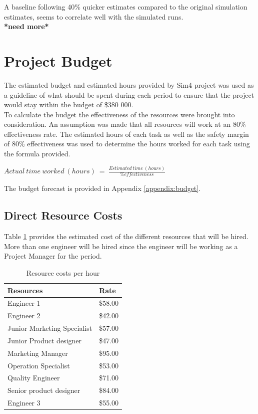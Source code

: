 A baseline following 40\% quicker estimates compared to the original simulation estimates, seems to correlate well with the simulated runs.\\

\textbf{*need more*}

\newpage
\section{Project Budget}

The estimated budget and estimated hours provided by Sim4 project was used as a guideline of what should be spent during each period to ensure that the project would stay within the budget of \$380 000.\\

\noindent
To calculate the budget the effectiveness of the resources were brought into consideration. An assumption was made that all resources will work at an 80\% effectiveness rate. The estimated hours of each task as well as the safety margin of 80\% effectiveness was used to determine the hours worked for each task using the formula provided.\\

\begin{center}
$ Actual\ time\ worked\ (hours)\ =\ \frac{Estimated\ time\ (hours)}{\% effectiveness} $
\end{center}

The budget forecast is provided in Appendix \ref{appendix:budget}.

\subsection{Direct Resource Costs}

Table \ref{tab:resourcecosts} provides the estimated cost of the different resources that will be hired. More than one engineer will be hired since the engineer will be working as a Project Manager for the period.

\begin{table}[]
\centering
\caption{Resource costs per hour}
\label{tab:resourcecosts}
\begin{tabular}{ll}
\textbf{Resources}          & \textbf{Rate} \\\hline
Engineer 1                  & \$58.00       \\
Engineer 2                  & \$42.00       \\
Junior Marketing Specialist & \$57.00       \\
Junior Product designer     & \$47.00       \\
Marketing Manager           & \$95.00       \\
Operation Specialist        & \$53.00       \\
Quality Engineer            & \$71.00       \\
Senior product designer     & \$84.00       \\
Engineer 3                  & \$55.00      
\end{tabular}
\end{table}

